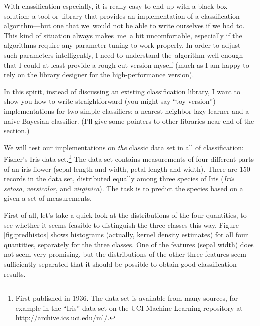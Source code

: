  
With classification especially, it is really easy to end up with a
black-box solution: a tool or~library that provides an implementation
of a classification algorithm---but one that we~would not be able to write
ourselves if we had to.  This kind of situation always makes~me~a bit
uncomfortable, especially if the algorithms require any parameter
tuning to work properly. In order to adjust such parameters
intelligently, I need to understand the~algorithm well enough that I
could at least provide a rough-cut version myself (much as I am happy
to rely on the library designer for the high-performance version).

In this spirit, instead of discussing an existing classification
library, I want to show you how to write straightforward (you might
say ``toy version'') implementations for two simple classifiers: a
nearest-neighbor lazy learner and a naive Bayesian classifier. (I'll
give some pointers to other libraries near end of the section.)

We will test our implementations on \emph{the} classic data set in all
of classification: Fisher's Iris data set.\footnote{First published in 1936. The data set is available from many 
  sources, for example in the ``Iris'' data set on the UCI Machine 
  Learning repository at \url{http://archive.ics.uci.edu/ml/}.} The data set
contains measurements of four different parts of an iris flower (sepal
length and width, petal length and width). There are 150 records in
the data set, distributed equally among three species of Iris
(\emph{Iris setosa}, \emph{versicolor}, and \emph{virginica}). The
task is to predict the species based on a given a set of measurements.

First of all, let's take a quick look at the distributions of the four
quantities, to see whether it seems feasible to distinguish the three
classes this way. Figure \ref{fig:predhistos} shows histograms
(actually, kernel density estimates) for all four quantities,
separately for the three classes. One of the features (sepal width)
does not seem very promising, but the distributions of the other three
features seem sufficiently separated that it should be possible to
obtain good classification\vadjust{\pagebreak} results.

